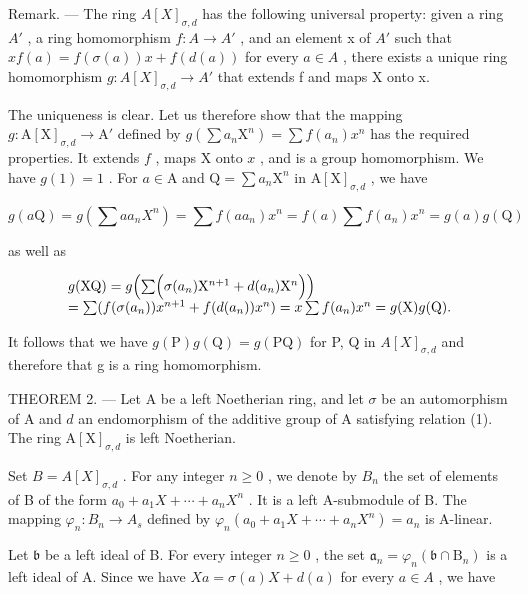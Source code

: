 Remark. --- The ring \(A[X]_{\sigma,d}\) has the following universal property: given a ring \(A'\) , a ring homomorphism \(f: A \to A'\) , and an element x of \(A'\) such that \(xf(a) = f(\sigma(a))x + f(d(a))\) for every \(a \in A\) , there exists a unique ring homomorphism \(g: A[X]_{\sigma,d} \to A'\) that extends f and maps X onto x.

The uniqueness is clear. Let us therefore show that the mapping \(g: \mathrm{A}[\mathrm{X}]_{\sigma,d} \to \mathrm{A}'\) defined by \(g(\sum a_n\mathrm{X}^n) = \sum f(a_n)x^n\) has the required properties. It extends \(f\) , maps \(\mathrm{X}\) onto \(x\) , and is a group homomorphism. We have \(g(1) = 1\) . For \(a \in \mathrm{A}\) and \(\mathrm{Q} = \sum a_n\mathrm{X}^n\) in \(\mathrm{A}[\mathrm{X}]_{\sigma,d}\) , we have

\[
g (a \mathrm{Q}) = g \left(\sum a a _ {n} X ^ {n}\right) = \sum f (a a _ {n}) x ^ {n} = f (a) \sum f (a _ {n}) x ^ {n} = g (a) g (\mathrm{Q})
\]

as well as

\[
\begin{array}{l} g (\mathrm{XQ}) = g \Bigl (\sum \Bigl (\sigma (a _ {n}) \mathrm{X} ^ {n + 1} + d (a _ {n}) \mathrm{X} ^ {n} \Bigr) \Bigr) \\ = \sum (f (\sigma (a _ {n})) x ^ {n + 1} + f (d (a _ {n})) x ^ {n}) = x \sum f (a _ {n}) x ^ {n} = g (\mathrm{X}) g (\mathrm{Q}). \end{array}
\]

It follows that we have \(g(\mathrm{P})g(\mathrm{Q}) = g(\mathrm{PQ})\) for P, Q in \(A[X]_{\sigma,d}\) and therefore that g is a ring homomorphism.

THEOREM 2. --- Let A be a left Noetherian ring, and let \(\sigma\) be an automorphism of A and \(d\) an endomorphism of the additive group of A satisfying relation (1). The ring \(\mathrm{A}[\mathrm{X}]_{\sigma,d}\) is left Noetherian.

Set \(B = A[X]_{\sigma,d}\) . For any integer \(n \geqslant 0\) , we denote by \(B_{n}\) the set of elements of B of the form \(a_{0} + a_{1}X + \cdots + a_{n}X^{n}\) . It is a left A-submodule of B. The mapping \(\varphi_{n}: B_{n} \to A_{s}\) defined by \(\varphi_{n}(a_{0} + a_{1}X + \cdots + a_{n}X^{n}) = a_{n}\) is A-linear.

Let \(\mathfrak{b}\) be a left ideal of B. For every integer \(n \geqslant 0\) , the set \(\mathfrak{a}_n = \varphi_n(\mathfrak{b} \cap \mathrm{B}_n)\) is a left ideal of A. Since we have \(Xa = \sigma(a)X + d(a)\) for every \(a \in A\) , we have


